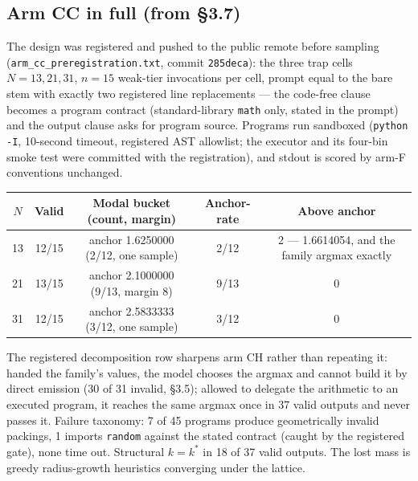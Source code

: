 \subsection{Arm CC in full (from \S3.7)}

The design was registered and pushed to the public remote before sampling
(\texttt{arm\_cc\_preregistration.txt}, commit \texttt{285deca}): the three trap cells
$N = 13, 21, 31$, $n = 15$ weak-tier invocations per cell, prompt equal to the bare stem with
exactly two registered line replacements --- the code-free clause becomes a program contract
(standard-library \texttt{math} only, stated in the prompt) and the output clause asks for program
source. Programs run sandboxed (\texttt{python -I}, 10-second timeout, registered AST allowlist;
the executor and its four-bin smoke test were committed with the registration), and stdout is
scored by arm-F conventions unchanged.

\begin{center}
\begin{small}
\setlength{\tabcolsep}{4pt}
\begin{tabular}{@{}ccccc@{}}
\toprule
$N$ & Valid & Modal bucket (count, margin) & Anchor-rate & Above anchor \\
\midrule
13 & 12/15 & anchor 1.6250000 (2/12, one sample) & 2/12 & 2 --- 1.6614054, and the family argmax exactly \\
21 & 13/15 & anchor 2.1000000 (9/13, margin 8) & 9/13 & 0 \\
31 & 12/15 & anchor 2.5833333 (3/12, one sample) & 3/12 & 0 \\
\bottomrule
\end{tabular}
\end{small}
\end{center}

The registered decomposition row sharpens arm CH rather than repeating it: handed the family's
values, the model chooses the argmax and cannot build it by direct emission (30 of 31 invalid,
\S3.5); allowed to delegate the arithmetic to an executed program, it reaches the same argmax once
in 37 valid outputs and never passes it. Failure taxonomy: 7 of 45 programs produce geometrically
invalid packings, 1 imports \texttt{random} against the stated contract (caught by the registered
gate), none time out. Structural $k = k^*$ in 18 of 37 valid outputs. The lost mass is greedy
radius-growth heuristics converging under the lattice.

